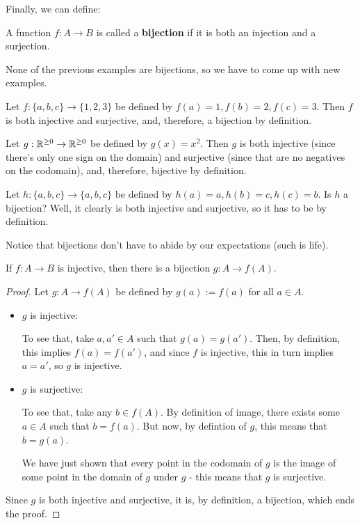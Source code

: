 Finally, we can define:
\begin{df}
	A function $f:A\to B$ is called a \textbf{bijection} if it is both an injection and a surjection.
\end{df}

\begin{ex}
	None of the previous examples are bijections, so we have to come up with new examples.
	
	Let $f:\{a,b,c\}\to\{1,2,3\}$ be defined by $f(a)=1,f(b)=2,f(c)=3$. Then $f$ is both injective and surjective, and, therefore, a bijection by definition.
	
	\bigskip
	Let $g:\mathbb R^{\geq0}\to\mathbb R^{\geq0}$ be defined by $g(x)=x^2$. Then $g$ is both injective (since there's only one sign on the domain) and surjective (since that are no negatives on the codomain), and, therefore, bijective by definition.
	
	\bigskip
	Let $h:\{a,b,c\}\to\{a,b,c\}$ be defined by $h(a)=a,h(b)=c,h(c)=b$. Is $h$ a bijection? Well, it clearly is both injective and surjective, so it has to be by definition.
	
	Notice that bijections don't have to abide by our expectations (such is life).
\end{ex}

\begin{lemma}\label{lem: inj bij im}
	If $f:A\to B$ is injective, then there is a bijection $g:A\to f(A)$.
\end{lemma}
\begin{proof}
	Let $g:A\to f(A)$ be defined by $g(a):=f(a)$ for all $a\in A$. 
	\begin{itemize}
		\item $g$ is injective:
		
		To see that, take $a,a'\in A$ such that $g(a)=g(a')$. Then, by definition, this implies $f(a)=f(a')$, and since $f$ is injective, this in turn implies $a=a'$, so $g$ is injective.
		
		\item $g$ is surjective:
		
		To see that, take any $b\in f(A)$. By definition of image, there exists some $a\in A$ such that $b=f(a)$. But now, by defintion of $g$, this means that $b=g(a)$.
		
		We have just shown that every point in the codomain of $g$ is the image of some point in the domain of $g$ under $g$ - this means that $g$ is surjective.
	\end{itemize}

Since $g$ is both injective and surjective, it is, by definition, a bijection, which ends the proof.
\end{proof}


